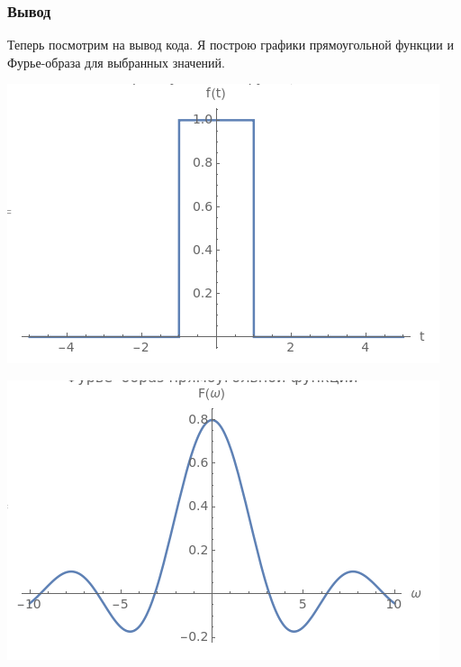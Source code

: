 \documentclass[a4paper,12pt]{article}
\begin{document}
\subsubsection{Вывод}
Теперь посмотрим на вывод кода. Я построю графики прямоугольной функции и Фурье-образа для выбранных значений.
\begin{center}
\begin{minipage}{0.48\textwidth}
  \centering
  \includegraphics[width=\linewidth]{images/1f11.png}
\end{minipage}
\hfill
\begin{minipage}{0.48\textwidth}
  \centering
  \includegraphics[width=\linewidth]{images/1F11.png}
\end{minipage}
\end{center}
\end{document}
